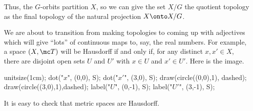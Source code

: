 \documentclass[../notes.tex]{subfiles}
\begin{document}
Thus, the $G$-orbits partition $X$, so we can give the set $X/G$ the quotient topology as the final topology of the natural projection $X\onto X/G$.
\begin{remark}
	We are about to transition from making topologies to coming up with adjectives which will give ``lots'' of continuous maps to, say, the real numbers. For example, a space $(X,\mc T)$ will be Hausdorff if and only if, for any distinct $x,x'\in X$, there are disjoint open sets $U$ and $U'$ with $x\in U$ and $x'\in U'$. Here is the image.
	\begin{center}
		\begin{asy}
			unitsize(1cm);
			dot("$x$", (0,0), S); dot("$x'$", (3,0), S);
			draw(circle((0,0),1), dashed); draw(circle((3,0),1),dashed);
			label("$U$", (0,-1), S);
			label("$U'$", (3,-1), S);
		\end{asy}
	\end{center}
	It is easy to check that metric spaces are Hausdorff.
\end{remark}
\end{document}
